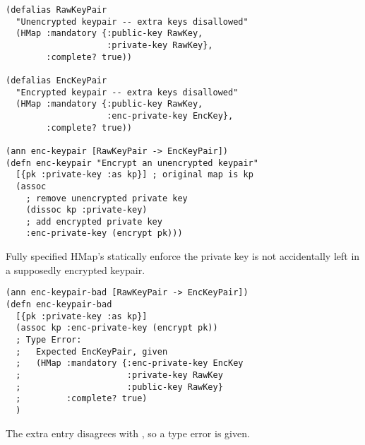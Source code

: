 \begin{exmp}
\begin{verbatim}
(defalias RawKeyPair
  "Unencrypted keypair -- extra keys disallowed"
  (HMap :mandatory {:public-key RawKey,
                    :private-key RawKey},
        :complete? true))

(defalias EncKeyPair
  "Encrypted keypair -- extra keys disallowed"
  (HMap :mandatory {:public-key RawKey,
                    :enc-private-key EncKey},
        :complete? true))

(ann enc-keypair [RawKeyPair -> EncKeyPair])
(defn enc-keypair "Encrypt an unencrypted keypair"
  [{pk :private-key :as kp}] ; original map is kp
  (assoc 
    ; remove unencrypted private key
    (dissoc kp :private-key)
    ; add encrypted private key
    :enc-private-key (encrypt pk)))
\end{verbatim}
\label{example:circleci}
\end{exmp}

Fully specified HMap's
statically enforce the private key is not accidentally left in a supposedly
encrypted keypair.

\begin{verbatim}
(ann enc-keypair-bad [RawKeyPair -> EncKeyPair])
(defn enc-keypair-bad
  [{pk :private-key :as kp}]
  (assoc kp :enc-private-key (encrypt pk))
  ; Type Error:
  ;   Expected EncKeyPair, given 
  ;   (HMap :mandatory {:enc-private-key EncKey
  ;                     :private-key RawKey
  ;                     :public-key RawKey}
  ;         :complete? true)
  )
\end{verbatim}

The extra  entry disagrees with , so a type error
is given.


